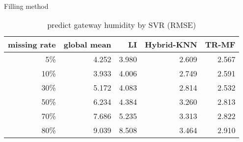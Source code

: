 \begin{table}[htbp]
\centering
\caption{predict gateway humidity by SVR (RMSE) }
\label{table: SVR}
   Filling method
\begin{tabular}{ r | r r r r}
        missing rate&global mean     &LI   &Hybrid-KNN &TR-MF\\ \hline
        5\%&4.252&3.980&2.609&2.567\\
        10\%    &3.933 &4.006&2.749&2.591\\
        30\%    &5.172&4.083&2.814&2.532\\
        50\%    &6.234&4.384&3.260&2.813\\
        70\%   &7.686&5.235&3.313&2.822\\
        80\%  &9.039&8.508&3.464&2.910\\
\end{tabular}
\end{table}
